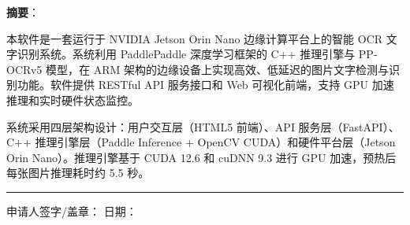 \documentclass[12pt,a4paper]{ctexart}
\begin{document}
\vspace{0.5cm}

\textbf{摘要}：

本软件是一套运行于 NVIDIA Jetson Orin Nano 边缘计算平台上的智能 OCR 文字识别系统。系统利用 PaddlePaddle 深度学习框架的 C++ 推理引擎与 PP-OCRv5 模型，在 ARM 架构的边缘设备上实现高效、低延迟的图片文字检测与识别功能。软件提供 RESTful API 服务接口和 Web 可视化前端，支持 GPU 加速推理和实时硬件状态监控。

系统采用四层架构设计：用户交互层（HTML5 前端）、API 服务层（FastAPI）、C++ 推理引擎层（Paddle Inference + OpenCV CUDA）和硬件平台层（Jetson Orin Nano）。推理引擎基于 CUDA 12.6 和 cuDNN 9.3 进行 GPU 加速，预热后每张图片推理耗时约 5.5 秒。

\vspace{1cm}

\noindent\rule{\textwidth}{0.4pt}

\begin{center}
申请人签字/盖章：\underline{\hspace{4cm}} \hspace{2cm} 日期：\underline{\hspace{3cm}}
\end{center}
\end{document}
